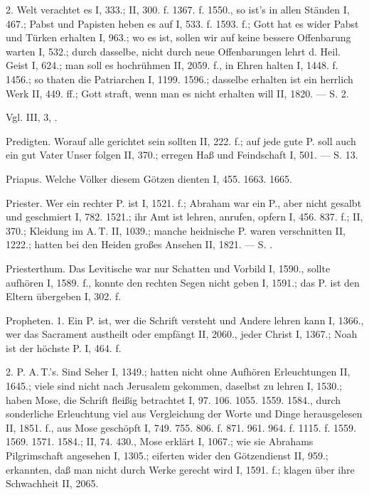 2.  Welt verachtet es I, 333.; II, 300. f. 1367. f. 1550., so ist’s in allen Ständen I, 467.; Pabst und Papisten heben es auf I, 533. f. 1593. f.; Gott hat es wider Pabst und Türken erhalten I, 963.; wo es ist, sollen wir auf keine bessere Offenbarung warten I, 532.; durch dasselbe, nicht durch neue Offenbarungen lehrt d. Heil. Geist I, 624.; man soll es hochrühmen II, 2059. f., in Ehren halten I, 1448. f. 1456.; so thaten die Patriarchen I, 1199. 1596.; dasselbe erhalten ist ein herrlich Werk II, 449. ff.; Gott straft, wenn man es nicht erhalten will II, 1820. — S.  2.

Vgl.  III,  3, .

Predigten. Worauf alle gerichtet sein sollten II, 222. f.; auf jede gute P. soll auch ein gut Vater Unser folgen II, 370.; erregen Haß und Feindschaft I, 501. — S.  13.

Priapus. Welche Völker diesem Götzen dienten I, 455. 1663. 1665.

Priester. Wer ein rechter P. ist I, 1521. f.; Abraham war ein P., aber nicht gesalbt und geschmiert I, 782. 1521.; ihr Amt ist lehren, anrufen, opfern I, 456. 837. f.; II, 370.; Kleidung im A.\,T. II, 1039.; manche heidnische P. waren verschnitten II, 1222.; hatten bei den Heiden großes Ansehen II, 1821. — S. .

Priesterthum. Das Levitische war nur Schatten und Vorbild I, 1590., sollte aufhören I, 1589. f., konnte den rechten Segen nicht geben I, 1591.; das P. ist den Eltern übergeben I, 302. f.

Propheten. 1.  Ein P. ist, wer die Schrift versteht und Andere lehren kann I, 1366., wer das Sacrament austheilt oder empfängt II, 2060., jeder Christ I, 1367.; Noah ist der höchste P. I, 464. f.

2.  P.  A.\,T.’s. Sind Seher I, 1349.; hatten nicht ohne Aufhören Erleuchtungen II, 1645.; viele sind nicht nach Jerusalem gekommen, daselbst zu lehren I, 1530.; haben Mose, die Schrift fleißig betrachtet I, 97. 106. 1055. 1559. 1584., durch sonderliche Erleuchtung viel aus Vergleichung der Worte und Dinge herausgelesen II, 1851. f., aus Mose geschöpft I, 749. 755. 806. f. 871. 961. 964. f. 1115. f. 1559. 1569. 1571. 1584.; II, 74. 430., Mose erklärt I, 1067.; wie sie Abrahams
Pilgrimschaft angesehen I, 1305.; eiferten wider den Götzendienst II, 959.; erkannten, daß man nicht durch Werke gerecht wird I, 1591. f.; klagen über ihre Schwachheit II, 2065.

